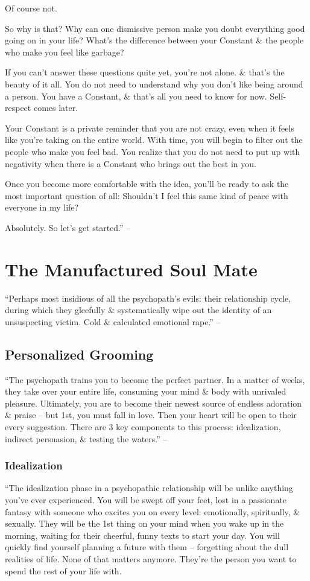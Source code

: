 \documentclass{article}
\numberwithin{equation}{section}
\begin{document}
Of course not.

So why is that? Why can one dismissive person make you doubt everything good going on in your life? What's the difference between your Constant \& the people who make you feel like garbage?

If you can't answer these questions quite yet, you're not alone. \& that's the beauty of it all. You do not need to understand why you don't like being around a person. You have a Constant, \& that's all you need to know for now. Self-respect comes later.

Your Constant is a private reminder that you are not crazy, even when it feels like you're taking on the entire world. With time, you will begin to filter out the people who make you feel bad. You realize that you do not need to put up with negativity when there is a Constant who brings out the best in you.

Once you become more comfortable with the idea, you'll be ready to ask the most important question of all: Shouldn't I feel this same kind of peace with everyone in my life?

Absolutely. So let's get started.'' -- \cite[pp. 19--22]{MacKenzie2015}


\section{The Manufactured Soul Mate}
``Perhaps most insidious of all the psychopath's evils: their relationship cycle, during which they gleefully \& systematically wipe out the identity of an unsuspecting victim. Cold \& calculated emotional rape.'' -- \cite[p. 23]{MacKenzie2015}

\subsection{Personalized Grooming}
``The psychopath trains you to become the perfect partner. In a matter of weeks, they take over your entire life, consuming your mind \& body with unrivaled pleasure. Ultimately, you are to become their newest source of endless adoration \& praise -- but 1st, you must fall in love. Then your heart will be open to their every suggestion. There are 3 key components to this process: idealization, indirect persuasion, \& testing the waters.'' -- \cite[p. 24]{MacKenzie2015}

\subsubsection{Idealization}
``The idealization phase in a psychopathic relationship will be unlike anything you've ever experienced. You will be swept off your feet, lost in a passionate fantasy with someone who excites you on every level: emotionally, spiritually, \& sexually. They will be the 1st thing on your mind when you wake up in the morning, waiting for their cheerful, funny texts to start your day. You will quickly find yourself planning a future with them -- forgetting about the dull realities of life. None of that matters anymore. They're the person you want to spend the rest of your life with.
\end{document}
